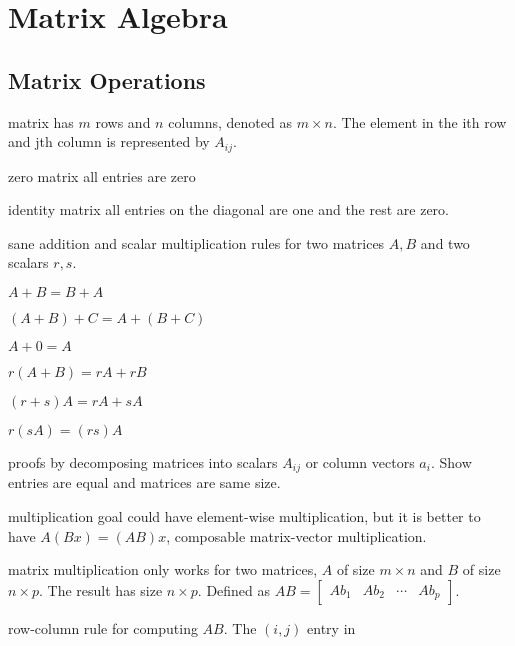 \section{Matrix Algebra}
\begin{outline}
\end{outline}

\begin{card}
    \subsection{Matrix Operations}

    \begin{compactdesc}
    \item[matrix] has $m$ rows and $n$ columns, denoted as $m \times n$.
        The element in the ith row and jth column is represented by $A_{ij}$.
    \item[zero matrix] all entries are zero
    \item[identity matrix] all entries on the diagonal are one and the rest are
        zero.
    \item[sane addition and scalar] multiplication rules for two matrices
        $A,B$ and two scalars $r,s$.
        \begin{compactenum}
        \item $A + B = B + A$
        \item $( A + B) + C = A + (B + C)$
        \item $A + 0 = A$
        \item $r(A + B) = rA + rB$
        \item $(r + s)A = rA + sA$
        \item $r(sA) = (rs)A$
        \end{compactenum}
    \item[proofs] by decomposing matrices into scalars $A_{ij}$ or column vectors
        $a_i$. Show entries are equal and matrices are same size.
    \item[multiplication goal] could have element-wise multiplication, but
        it is better to have $A(Bx) = (AB)x$, composable matrix-vector
        multiplication.
    \item[matrix multiplication] only works for two matrices, $A$ of size
    $m \times n$ and $B$ of size $n \times p$. The result has size $n \times p$.
    Defined as $AB = \begin{bmatrix}Ab_1 & Ab_2 & \cdots & Ab_p \end{bmatrix}$.
    \item[row-column rule] for computing $AB$. The $(i,j)$ entry in

\end{compactdesc}
\end{card}
